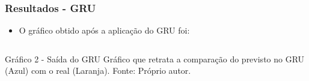 \documentclass[aspectratio=169]{beamer}
\begin{document}
	\begin{frame}[fragile]
		\frametitle{Resultados - GRU}
	
		\begin{itemize} 
			\item O gráfico obtido após a aplicação do GRU foi:
		\end{itemize}
	
			\begin{columns}[c]
				\begin{column}{1\linewidth}
					\begin{figure}
						\label{fig:gru}
					\end{figure}
	
					\begin{block}{Gráfico 2 - Saída do GRU}
						Gráfico que retrata a comparação do previsto no GRU (Azul) com o real (Laranja). \newline Fonte: Próprio autor.    
					\end{block}
				\end{column}
			\end{columns}
		\end{frame}
\end{document}
